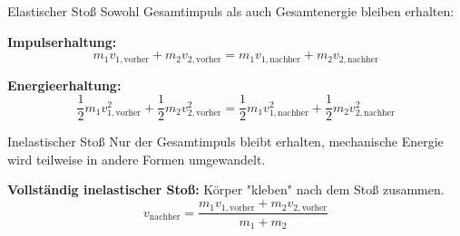 \begin{definition}{Elastischer Stoß}
    Sowohl Gesamtimpuls als auch Gesamtenergie bleiben erhalten:
    
    \textbf{Impulserhaltung:}
    \begin{equation}
        m_1 v_{1,\text{vorher}} + m_2 v_{2,\text{vorher}} = m_1 v_{1,\text{nachher}} + m_2 v_{2,\text{nachher}}
    \end{equation}
    
    \textbf{Energieerhaltung:}
    \begin{equation}
        \frac{1}{2}m_1 v_{1,\text{vorher}}^2 + \frac{1}{2}m_2 v_{2,\text{vorher}}^2 = \frac{1}{2}m_1 v_{1,\text{nachher}}^2 + \frac{1}{2}m_2 v_{2,\text{nachher}}^2
    \end{equation}
\end{definition}

\begin{definition}{Inelastischer Stoß}
    Nur der Gesamtimpuls bleibt erhalten, mechanische Energie wird teilweise in andere Formen umgewandelt.
    
    \textbf{Vollständig inelastischer Stoß:} Körper "kleben" nach dem Stoß zusammen.
    \begin{equation}
        v_{\text{nachher}} = \frac{m_1 v_{1,\text{vorher}} + m_2 v_{2,\text{vorher}}}{m_1 + m_2}
    \end{equation}
\end{definition}

